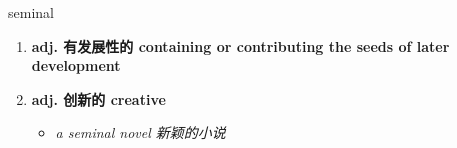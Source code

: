 
\begin{frame}
{\huge seminal}
\begin{center}
\begin{enumerate}\Large
  \item \textbf{adj. 有发展性的 containing or contributing the seeds of later development}
  \item \textbf{adj. 创新的 creative}
  \begin{itemize}
    \item \em{\Large{a seminal novel 新颖的小说}}
  \end{itemize}
\end{enumerate}
\end{center}
\end{frame}
